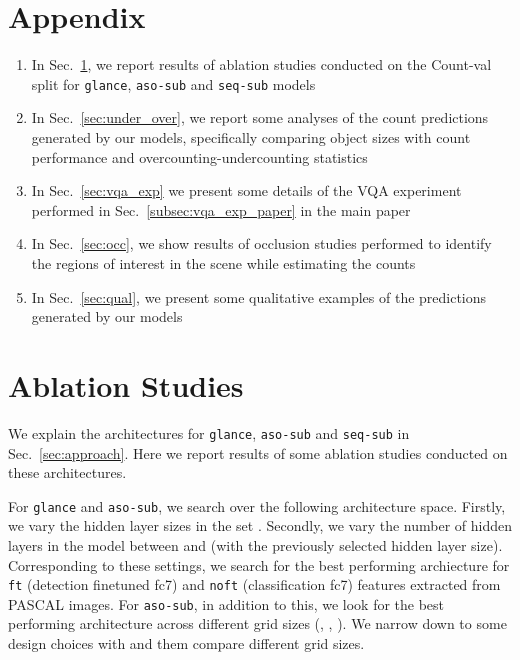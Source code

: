 \documentclass[10pt,twocolumn,letterpaper]{article}
\newcommand{\sub}{\texttt{aso-sub}\xspace}
\newcommand{\seq}{\texttt{seq-sub}\xspace}
\newcommand{\glance}{\texttt{glance}\xspace}
\newcommand{\refsec}[1]{Sec.~\ref{#1}}
\begin{document}
{\small


}

\clearpage
\section*{Appendix}\label{sec:appendix}
\setcounter{section}{0}
\normalsize
\newenvironment{packed_itemize}{
\begin{enumerate}{\labelitemi}{\leftmargin=2em}
\vspace{-6pt}
 \setlength{\itemsep}{0pt}
 \setlength{\parskip}{0pt}
 \setlength{\parsep}{0pt}
}
{\end{enumerate}}

\begin{enumerate}
\itemsep0em
\item In \refsec{sec:abl}, we report results of ablation studies conducted on the Count-val split for \glance, \sub and \seq models
\item In \refsec{sec:under_over}, we report some analyses of the count predictions generated by our models, specifically comparing object sizes with count performance and overcounting-undercounting statistics
\item In \refsec{sec:vqa_exp} we present some details of the VQA experiment performed in \refsec{subsec:vqa_exp_paper} in the main paper
\item In \refsec{sec:occ}, we show results of occlusion studies performed to identify the regions of interest in the scene while estimating the counts
\item In \refsec{sec:qual}, we present some qualitative examples of the predictions generated by our models
\end{enumerate}

\section{Ablation Studies}\label{sec:abl}
We explain the architectures for \glance, \sub and \seq in \refsec{sec:approach}. Here we report results of some ablation studies conducted on these architectures.

For \glance and \sub, we search over the following architecture space. Firstly, we vary the hidden layer sizes in the set . Secondly, we vary the number of hidden layers in the model between  and  (with the previously selected hidden layer size). Corresponding to these settings, we search for the best performing archiecture for \texttt{ft} (detection finetuned fc7) and \texttt{noft} (classification fc7) features extracted from PASCAL images. For \sub, in addition to this, we look for the best performing architecture across different grid sizes (, , ). We narrow down to some design choices with  and them compare different grid sizes.
\end{document}
